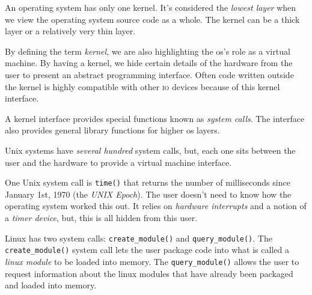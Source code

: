 
An operating system has only one kernel.
It's considered the \textit{lowest layer} 
when we view the operating system source code as a whole. 
The kernel can be a thick layer or a relatively very thin layer. 






By defining the term \textit{kernel}, we are also highlighting
the os's role as a virtual machine. 
By having a kernel, we hide certain details of the hardware from the user to present an 
abstract programming interface. Often code written outside the kernel is 
highly compatible with other \textsc{io} devices because of this kernel interface. 

A kernel interface provides special functions known as \textit{system calls}.
The interface also provides general library functions for higher os layers. 








Unix systems have \textit{several hundred} system calls, but, each one 
sits between the user and the hardware to provide a virtual machine interface.  

\begin{example}
One Unix system call is \lstinline{time()} that returns the number of milliseconds 
since January 1st, 1970 (the \textit{\textsc{UNIX} Epoch}). The user doesn't need to know 
how the operating system worked this out. It relies on \textit{hardware interrupts}
and a notion of a \textit{timer device}, but, this is all hidden from this user. 
\end{example}

\begin{example}
Linux has two system calls: \lstinline{create_module()} and \lstinline{query_module()}.
The \lstinline{create_module()} system call lets the user package code into
what is called a \textit{linux module} to be loaded into memory.
The \lstinline{query_module()} allows the user to request information about 
the linux modules that have already been packaged and loaded into memory.
\end{example}



